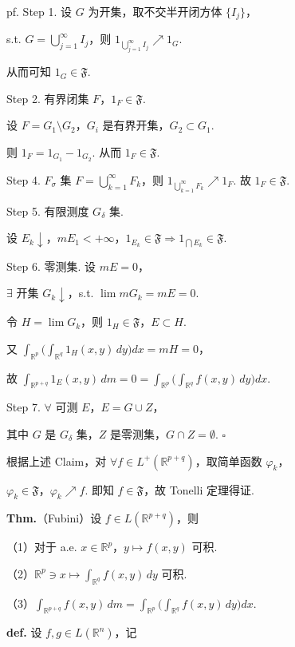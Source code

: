 \documentclass[11pt]{ctexart}
\theoremstyle{definition}
\begin{document}
pf. Step 1. 设 $G$ 为开集，取不交半开闭方体 $\{I_j\}$，

s.t. $G = \bigcup\limits_{j=1}^{\infty} I_j$，则 $1_{\bigcup\limits_{j=1}^{\infty} I_j} \nearrow 1_G$.

从而可知 $1_G \in \mathfrak{F}$.

Step 2. 有界闭集 $F$，$1_F \in \mathfrak{F}$.

设 $F = G_1 \setminus G_2$，$G_i$ 是有界开集，$G_2 \subset G_1$.

则 $1_F = 1_{G_1} - 1_{G_2}$. 从而 $1_F \in \mathfrak{F}$.

Step 4. $F_\sigma$ 集 $F = \bigcup\limits_{k=1}^{\infty} F_k$，则 $1_{\bigcup\limits_{k=1}^{\infty} F_k} \nearrow 1_F$. 故 $1_F \in \mathfrak{F}$.

Step 5. 有限测度 $G_\delta$ 集.

设 $E_k \downarrow$，$mE_1 < +\infty$，$1_{E_k} \in \mathfrak{F} \Rightarrow 1_{\bigcap E_k} \in \mathfrak{F}$.

Step 6. 零测集. 设 $mE = 0$，

$\exists$ 开集 $G_k \downarrow$，s.t. $\lim mG_k = mE = 0$.

令 $H = \lim G_k$，则 $1_H \in \mathfrak{F}$，$E \subset H$.

又 $\displaystyle\int_{\mathbb{R}^p} \Big( \int_{\mathbb{R}^q} 1_H(x, y)\, dy \Big) dx = mH = 0$，

故 $\displaystyle\int_{\mathbb{R}^{p+q}} 1_E(x, y)\, dm = 0 = \int_{\mathbb{R}^p} \Big( \int_{\mathbb{R}^q} f(x, y)\, dy \Big) dx$.

Step 7. $\forall$ 可测 $E$，$E = G \cup Z$，

其中 $G$ 是 $G_\delta$ 集，$Z$ 是零测集，$G \cap Z = \emptyset$. $\square$

根据上述 Claim，对 $\forall f \in L^+(\mathbb{R}^{p+q})$，取简单函数 $\varphi_k$，

$\varphi_k \in \mathfrak{F}$，$\varphi_k \nearrow f$. 即知 $f \in \mathfrak{F}$，故 Tonelli 定理得证.

\textbf{Thm.}（Fubini）设 $f \in L(\mathbb{R}^{p+q})$，则

（1）对于 a.e. $x \in \mathbb{R}^p$，$y \mapsto f(x, y)$ 可积.

（2）$\mathbb{R}^p \ni x \mapsto \displaystyle\int_{\mathbb{R}^q} f(x, y)\, dy$ 可积.

（3）$\displaystyle\int_{\mathbb{R}^{p+q}} f(x, y)\, dm = \int_{\mathbb{R}^p} \Big( \int_{\mathbb{R}^q} f(x, y)\, dy \Big) dx$.

\textbf{def.} 设 $f, g \in L(\mathbb{R}^n)$，记
\end{document}
